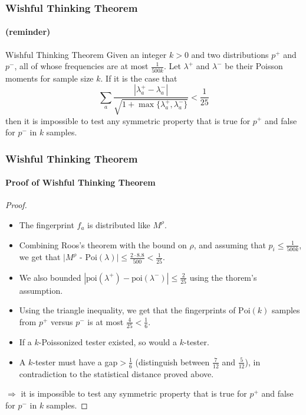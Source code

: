 \documentclass{beamer}
\begin{document}
\begin{frame}
  \frametitle{Wishful Thinking Theorem} \framesubtitle{(reminder)}

  \begin{block}{Wishful Thinking Theorem}
    Given an integer $k>0$ and two distributions $p^+$ and $p^-$, all
    of whose frequencies are at most $\frac{1}{500k}$. Let $\lambda^+$
    and $\lambda^-$ be their Poisson moments for sample size $k$. If
    it is the case that
    \begin{equation*}
      \sum_a\frac{|\lambda^+_a-\lambda^-_a|}{\sqrt{1+\max\{\lambda^+_a,\lambda^-_a\}}}<\frac{1}{25}
    \end{equation*}
    then it is impossible to test any symmetric property that is true
    for $p^+$ and false for $p^-$ in $k$ samples.
  \end{block}

\end{frame}


\begin{frame}
  \frametitle{Wishful Thinking Theorem} \framesubtitle{Proof of
    Wishful Thinking Theorem}  
    
    \begin{proof}
    \begin{itemize}
    \item The fingerprint $f_a$ is distributed like $M^\rho$.
\item Combining Roos's theorem with the bound on $\rho$, and assuming that $p_i\le\frac{1}{500k}$, we get that $|M^\rho$ - $\mbox{Poi}(\lambda)|\le \frac{2\cdot 8.8}{500}<\frac{1}{25}$.
\item We also bounded $|\mbox{poi}(\lambda^+)-\mbox{poi}(\lambda^-)|\le\frac{2}{25}$ using the thorem's assumption.
\item Using the triangle inequality, we get that the fingerprints of $\mbox{Poi}(k)$ samples from $p^+$ versus $p^-$ is at most $\frac{4}{25}<\frac{1}{6}$.
\item If a $k$-Poissonized tester existed, so would a $k$-tester.
\item A $k$-tester must have a gap$>\frac{1}{6}$ (distinguish between $\frac{7}{12}$ and $\frac{5}{12}$), in contradiction to the statistical distance proved above.
\end{itemize}
$\Rightarrow $ it is impossible to test any symmetric property that is true for $p^+$ and false for $p^-$ in $k$ samples.
    \end{proof}
\end{frame}
\end{document}
